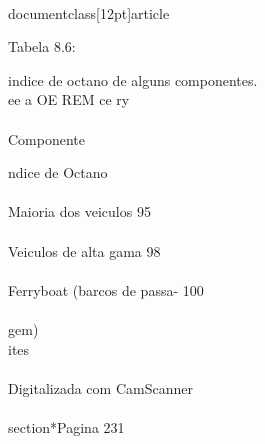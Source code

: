 \\documentclass[12pt]{article}
\begin{document}
Tabela 8.6: \\{indice de octano de alguns componentes.\\
ee a OE REM ce ry\\
\\
Componente \\{ndice de Octano\\
\\
Maioria dos veiculos 95\\
\\
Veiculos de alta gama 98\\
\\
Ferryboat (barcos de passa- 100\\
\\
gem)\\
ites\\
\\
Digitalizada com CamScanner\\

\\section*{Pagina 231}

}}
\end{document}
